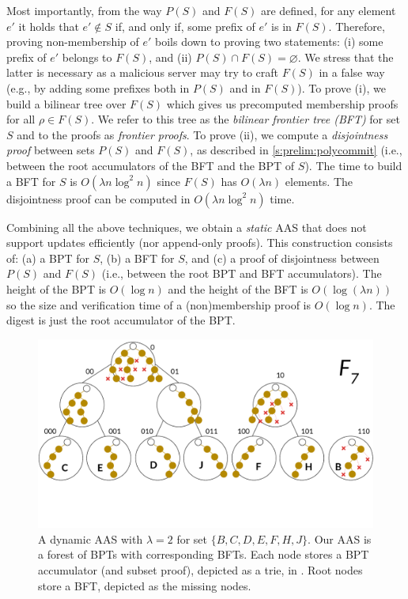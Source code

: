 Most importantly, from the way $P(S)$ and $F(S)$ are defined, for any element $e'$ it holds that $e'\not\in S$ if, and only if, some prefix of $e'$ is in $F(S)$. 
Therefore, proving non-membership of $e'$ boils down to proving two statements: (i) some prefix of $e'$ belongs to $F(S)$, and (ii) $P(S) \cap F(S) = \varnothing$.
We stress that the latter is necessary as a malicious server may try to craft $F(S)$ in a false way (e.g., by adding some prefixes both in $P(S)$ and in $F(S)$).
To prove (i), we build a bilinear tree over $F(S)$ which gives us precomputed membership proofs for all $\rho \in F(S)$.
We refer to this tree as the \emph{bilinear frontier tree (BFT)} for set $S$ and to the proofs as \textit{frontier proofs}.
To prove (ii), we compute a \emph{disjointness proof} between sets $P(S)$ and $F(S)$, as described in \cref{s:prelim:polycommit} (i.e., between the root accumulators of the BFT and the BPT of $S$).
The time to build a BFT for $S$ is $O(\lambda n\log^2{n})$ since $F(S)$ has $O(\lambda n)$ elements.
The disjointness proof can be computed in $O(\lambda n\log^2{n})$ time. 

Combining all the above techniques, we obtain a \textit{static} AAS that does not support updates efficiently (nor append-only proofs).
This construction consists of: (a) a BPT for $S$, (b) a BFT for $S$, and (c) a proof of disjointness between $P(S)$ and $F(S)$ (i.e., between the root BPT and BFT accumulators).
The height of the BPT is $O(\log n)$ and the height of the BFT is $O(\log{(\lambda n)})$ so the size and verification time of a (non)membership proof is $O(\log{n})$.
The digest is just the root accumulator of the BPT. 

\begin{figure}[t]
    \centering
    \includegraphics[width=1.00\columnwidth]{figures/accaad.pdf}
    \vspace{-1.7cm}
    \caption{
        A dynamic AAS with $\lambda=2$ for set $\{B,C,D,E,F,H,J\}$.
        Our AAS is a forest of BPTs with corresponding BFTs.
        Each node stores a BPT accumulator (and subset proof), depicted as a trie, in .
        Root nodes store a BFT, depicted as the missing  nodes.
    }
    \vspace{-1.9em}
    \label{f:accaas}
\end{figure}

